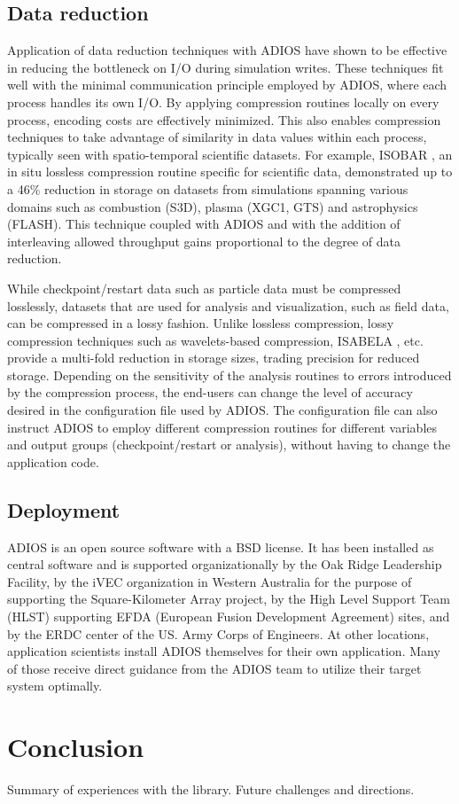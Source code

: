 %
%
\subsection{Data reduction}

Application of data reduction techniques with ADIOS have shown to be effective in reducing the
bottleneck on I/O during simulation writes. These techniques fit well with the minimal communication
principle employed by ADIOS, where each process handles its own I/O. By applying compression
routines locally on every process, encoding costs are effectively minimized. This also enables
compression techniques to take advantage of similarity in data values within each process, typically
seen with spatio-temporal scientific datasets. For example, ISOBAR \cite{ADIOS:Schendel2012b}, an in situ
lossless compression routine specific for scientific data, demonstrated up to a 46\% reduction in
storage on datasets from simulations spanning various domains such as combustion (S3D), plasma
(XGC1, GTS) and astrophysics (FLASH). This technique coupled with ADIOS and with the addition of
interleaving allowed throughput gains proportional to the degree of data reduction.

While checkpoint/restart data such as particle data must be compressed losslessly, datasets that are
used for analysis and visualization, such as field data, can be compressed in a lossy fashion.
Unlike lossless compression, lossy compression techniques such as wavelets-based compression,
ISABELA \cite{ADIOS:Lakshminarasimhan2013a}, etc. provide a multi-fold reduction in storage sizes, trading
precision for reduced storage. Depending on the sensitivity of the analysis routines to errors
introduced by the compression process, the end-users can change the level of accuracy desired in the
configuration file used by ADIOS. The configuration file can also instruct ADIOS to employ different
compression routines for different variables and output groups (checkpoint/restart or analysis),
without having to change the application code.


%
%
\subsection{Deployment}
ADIOS is an open source software with a BSD license. It has been installed as central software and is supported organizationally by the Oak Ridge Leadership Facility, by the iVEC organization in Western Australia for the purpose of supporting the Square-Kilometer Array project, by the High Level Support Team (HLST) supporting EFDA (European Fusion Development Agreement) sites, and by the ERDC center of the US. Army Corps of Engineers. At other locations, application scientists install ADIOS themselves for their own application. Many of those receive direct guidance from the ADIOS team to utilize their target system optimally.




%
%
\section{Conclusion}
{\color {red}Summary of experiences with the library. Future challenges and directions.}


